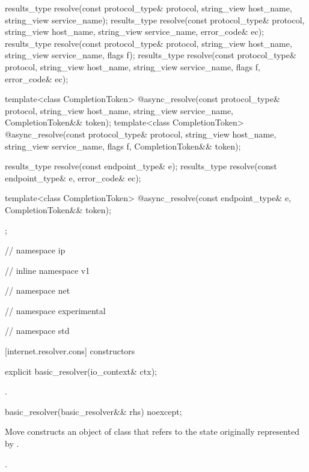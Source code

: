 \begin{codeblock}
{{{{{{    results_type resolve(const protocol_type& protocol,
                         string_view host_name, string_view service_name);
    results_type resolve(const protocol_type& protocol,
                         string_view host_name, string_view service_name,
                         error_code& ec);
    results_type resolve(const protocol_type& protocol,
                         string_view host_name, string_view service_name,
                         flags f);
    results_type resolve(const protocol_type& protocol,
                         string_view host_name, string_view service_name,
                         flags f, error_code& ec);

    template<class CompletionToken>
      @\DEDUCED@ async_resolve(const protocol_type& protocol,
                            string_view host_name, string_view service_name,
                            CompletionToken&& token);
    template<class CompletionToken>
      @\DEDUCED@ async_resolve(const protocol_type& protocol,
                            string_view host_name, string_view service_name,
                            flags f, CompletionToken&& token);

    results_type resolve(const endpoint_type& e);
    results_type resolve(const endpoint_type& e, error_code& ec);

    template<class CompletionToken>
      @\DEDUCED@ async_resolve(const endpoint_type& e,
                            CompletionToken&& token);
  };

} // namespace ip
} // inline namespace v1
} // namespace net
} // namespace experimental
} // namespace std
\end{codeblock}


[internet.resolver.cons]{ constructors}

\begin{itemdecl}
explicit basic_resolver(io_context& ctx);
\end{itemdecl}

\begin{itemdescr}
\pnum
\postconditions {}.
\end{itemdescr}

\begin{itemdecl}
basic_resolver(basic_resolver&& rhs) noexcept;
\end{itemdecl}

\begin{itemdescr}
\pnum
\effects Move constructs an object of class  that refers to the state originally represented by .

\pnum
\postconditions {}.
\end{itemdescr}



